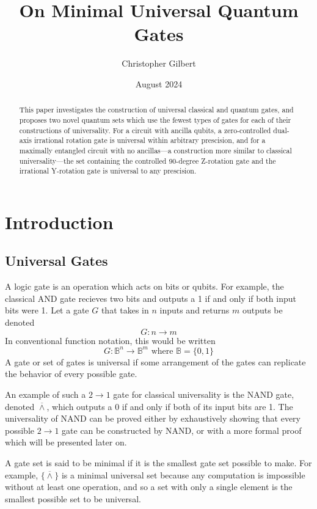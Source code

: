 \documentclass[12pt]{article}
\title{On Minimal Universal Quantum Gates}
\author{Christopher Gilbert}
\date{August 2024}
\newcommand{\nand}{\overline{\land}}
\begin{document}
\maketitle

\begin{abstract}
This paper investigates the construction of universal classical and quantum gates, and proposes two novel quantum sets which use the fewest types of gates for each of their constructions of universality. For a circuit with ancilla qubits, a zero-controlled dual-axis irrational rotation gate is universal within arbitrary prescision, and for a maximally entangled circuit with no ancillas—a construction more similar to classical universality—the set containing the controlled 90-degree Z-rotation gate and the irrational Y-rotation gate is universal to any prescision.
\end{abstract}

\section{Introduction}

\subsection{Universal Gates}
A logic gate is an operation which acts on bits or qubits. For example, the classical AND gate recieves two bits and outputs a 1 if and only if both input bits were 1. Let a gate $G$ that takes in $n$ inputs and returns $m$ outputs be denoted
$$G : n \to m$$
In conventional function notation, this would be written
$$G : \mathbb{B}^n \to \mathbb{B}^m \text{ where } \mathbb{B} = \{0, 1\}$$
A gate or set of gates is universal if some arrangement of the gates can replicate the behavior of every possible gate.

An example of such a $2 \to 1$ gate for classical universality is the NAND gate, denoted $\nand$, which outputs a 0 if and only if both of its input bits are 1. The universality of NAND can be proved either by exhaustively showing that every possible $2 \to 1$ gate can be constructed by NAND, or with a more formal proof which will be presented later on.

A gate set is said to be minimal if it is the smallest gate set possible to make. For example, $\{ \nand \}$ is a minimal universal set because any computation is impossible without at least one operation, and so a set with only a single element is the smallest possible set to be universal.
\end{document}
